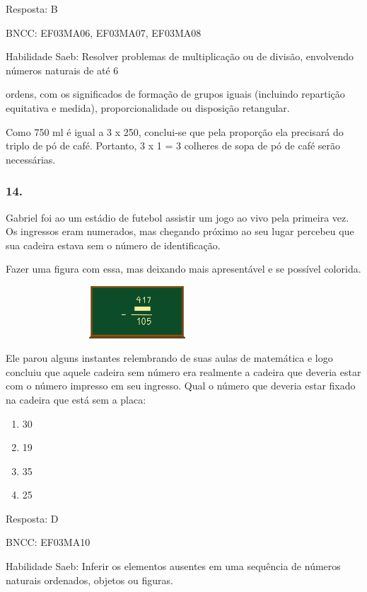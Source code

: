 Resposta: B

BNCC: EF03MA06, EF03MA07, EF03MA08

Habilidade Saeb: Resolver problemas de multiplicação ou de divisão,
envolvendo números naturais de até 6

ordens, com os significados de formação de grupos iguais (incluindo
repartição equitativa e medida), proporcionalidade ou disposição
retangular.

Como 750 ml é igual a 3 x 250, conclui-se que pela proporção ela
precisará do triplo de pó de café. Portanto, 3 x 1 = 3 colheres de sopa
de pó de café serão necessárias.

\subsubsection{14.}\label{section-154}

Gabriel foi ao um estádio de futebol assistir um jogo ao vivo pela
primeira vez. Os ingressos eram numerados, mas chegando próximo ao seu
lugar percebeu que sua cadeira estava sem o número de identificação.

Fazer uma figura com essa, mas deixando mais apresentável e se possível
colorida.

\includegraphics[width=3.87534in,height=0.76673in]{media/image122.png}

Ele parou alguns instantes relembrando de suas aulas de matemática e
logo concluiu que aquele cadeira sem número era realmente a cadeira que
deveria estar com o número impresso em seu ingresso. Qual o número que
deveria estar fixado na cadeira que está sem a placa:

\begin{enumerate}
\def\labelenumi{\alph{enumi})}
\item
  30
\item
  19
\item
  35
\item
  25
\end{enumerate}

Resposta: D

BNCC: EF03MA10

Habilidade Saeb: Inferir os elementos ausentes em uma sequência de
números naturais ordenados, objetos ou figuras.

